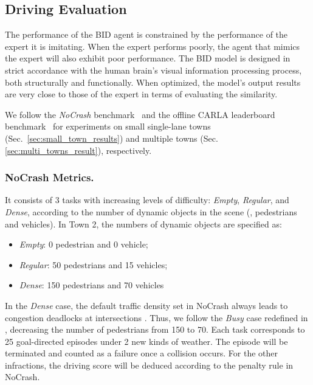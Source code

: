 \subsection{Driving Evaluation}
\label{sec:Metrics}
The performance of the BID agent is constrained by the performance of the expert it is imitating. 
When the expert performs poorly, the agent that mimics the expert will also exhibit poor performance. 
The BID model is designed in strict accordance with the human brain's visual information processing process, both structurally and functionally. 
When optimized, the model's output results are very close to those of the expert in terms of evaluating the similarity.


We follow the \emph{NoCrash} benchmark~\cite{Codevilla:2019} and the offline CARLA leaderboard benchmark~\cite{Zhang:2021,Hu:2022} for experiments on small single-lane towns (Sec.~\ref{sec:small_town_results}) and multiple towns (Sec.~ \ref{sec:multi_towns_result}), respectively.


\subsubsection{NoCrash Metrics.}\label{nocrash_metrics}
\hspace{1pc}It consists of 3 tasks with increasing levels of difficulty: \emph{Empty}, \emph{Regular}, and \emph{Dense}, according to the number of dynamic objects in the scene ({\ie}, pedestrians and vehicles). 
In Town 2, the numbers of dynamic objects are specified as:
\begin{itemize}
	\item \emph{Empty}: 0 pedestrian and 0 vehicle;
	\item \emph{Regular}: 50 pedestrians and 15 vehicles;
	\item \emph{Dense}: 150 pedestrians and 70 vehicles
\end{itemize}
In the \emph{Dense} case, the default traffic density set in NoCrash always leads to congestion deadlocks at intersections \cite{Zhang:2021}. 
Thus, we follow the \emph{Busy} case redefined in \cite{Zhang:2021}, decreasing the number of pedestrians from 150 to 70. 
Each task corresponds to 25 goal-directed episodes under 2 new kinds of weather.
The episode will be terminated and counted as a failure once a collision occurs. 
For the other infractions, the driving score will be deduced according to the penalty rule in NoCrash. 



